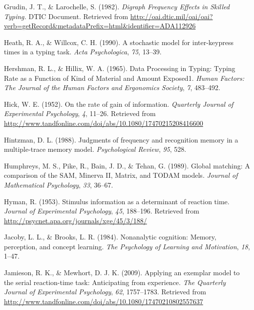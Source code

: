 \documentclass[,man,donotrepeattitle,floatsintext]{apa6}
\begin{document}
\leavevmode\hypertarget{ref-grudin_digraph_1982}{}%
Grudin, J. T., \& Larochelle, S. (1982). \emph{Digraph Frequency Effects in Skilled Typing.} DTIC Document. Retrieved from \url{http://oai.dtic.mil/oai/oai?verb=getRecord\&metadataPrefix=html\&identifier=ADA112926}

\leavevmode\hypertarget{ref-heath_stochastic_1990}{}%
Heath, R. A., \& Willcox, C. H. (1990). A stochastic model for inter-keypress times in a typing task. \emph{Acta Psychologica}, \emph{75}, 13--39.

\leavevmode\hypertarget{ref-HershmanDataProcessingTyping1965}{}%
Hershman, R. L., \& Hillix, W. A. (1965). Data Processing in Typing: Typing Rate as a Function of Kind of Material and Amount Exposed1. \emph{Human Factors: The Journal of the Human Factors and Ergonomics Society}, \emph{7}, 483--492.

\leavevmode\hypertarget{ref-hick_rate_1952}{}%
Hick, W. E. (1952). On the rate of gain of information. \emph{Quarterly Journal of Experimental Psychology}, \emph{4}, 11--26. Retrieved from \url{http://www.tandfonline.com/doi/abs/10.1080/17470215208416600}

\leavevmode\hypertarget{ref-hintzman_judgments_1988}{}%
Hintzman, D. L. (1988). Judgments of frequency and recognition memory in a multiple-trace memory model. \emph{Psychological Review}, \emph{95}, 528.

\leavevmode\hypertarget{ref-humphreys_global_1989}{}%
Humphreys, M. S., Pike, R., Bain, J. D., \& Tehan, G. (1989). Global matching: A comparison of the SAM, Minerva II, Matrix, and TODAM models. \emph{Journal of Mathematical Psychology}, \emph{33}, 36--67.

\leavevmode\hypertarget{ref-hyman_stimulus_1953}{}%
Hyman, R. (1953). Stimulus information as a determinant of reaction time. \emph{Journal of Experimental Psychology}, \emph{45}, 188--196. Retrieved from \url{http://psycnet.apa.org/journals/xge/45/3/188/}

\leavevmode\hypertarget{ref-JacobyNonanalyticcognitionMemory1984}{}%
Jacoby, L. L., \& Brooks, L. R. (1984). Nonanalytic cognition: Memory, perception, and concept learning. \emph{The Psychology of Learning and Motivation}, \emph{18}, 1--47.

\leavevmode\hypertarget{ref-jamieson_applying_2009}{}%
Jamieson, R. K., \& Mewhort, D. J. K. (2009). Applying an exemplar model to the serial reaction-time task: Anticipating from experience. \emph{The Quarterly Journal of Experimental Psychology}, \emph{62}, 1757--1783. Retrieved from \url{http://www.tandfonline.com/doi/abs/10.1080/17470210802557637}
\end{document}
